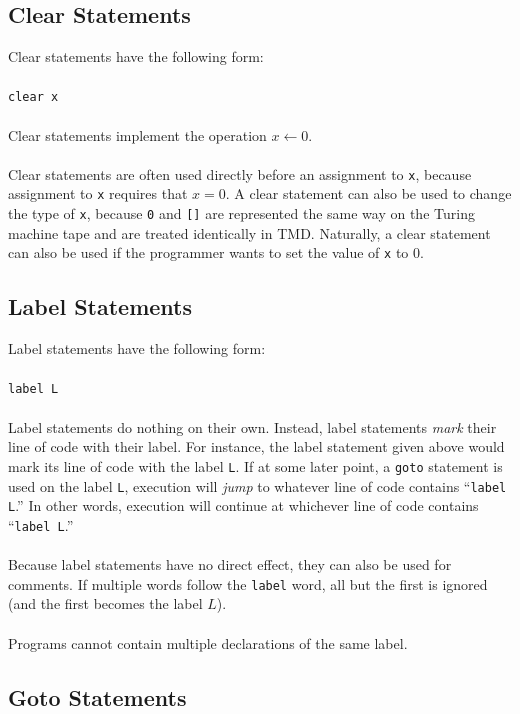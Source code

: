 \subsection{Clear Statements}

Clear statements have the following form: \\ \\
\texttt{clear x} \\ \\ 
Clear statements implement the operation $x \leftarrow 0$. \\ \\
Clear statements are often used directly before an assignment to \texttt{x}, because assignment to \texttt{x} requires that $x = 0$. A clear statement can also be used to change the type of \texttt{x}, because \texttt{0} and \texttt{[]} are represented the same way on the Turing machine tape and are treated identically in TMD. Naturally, a clear statement can also be used if the programmer wants to set the value of \texttt{x} to 0. \\

\subsection{Label Statements}

Label statements have the following form: \\ \\ 
\texttt{label L} \\ \\
Label statements do nothing on their own. Instead, label statements \emph{mark} their line of code with their label. For instance, the label statement given above would mark its line of code with the label \texttt{L}. If at some later point, a \texttt{goto} statement is used on the label \texttt{L}, execution will \emph{jump} to whatever line of code contains ``\texttt{label L}.'' In other words, execution will continue at whichever line of code contains ``\texttt{label L}.'' \\ \\
Because label statements have no direct effect, they can also be used for comments. If multiple words follow the \texttt{label} word, all but the first is ignored (and the first becomes the label $L$). \\ \\
Programs cannot contain multiple declarations of the same label.

\subsection{Goto Statements}

